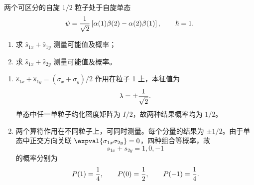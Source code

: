 \begin{question}
两个可区分的自旋 $1/2$ 粒子处于自旋单态
\[
  \psi={1\over\sqrt2}\left[\alpha(1)\beta(2)-\alpha(2)\beta(1)\right],
  \qquad \hbar=1.
\]
\begin{enumerate}
  \item 求 $\hat s_{1x}+\hat s_{1y}$ 测量可能值及概率；
  \item 求 $\hat s_{1x}+\hat s_{2y}$ 测量可能值及概率。
\end{enumerate}
\begin{solution}
\begin{enumerate}
  \item $\hat s_{1x}+\hat s_{1y}=(\sigma_x+\sigma_y)/2$ 作用在粒子 1 上，本征值为
  \[
    \lambda=\pm {1\over\sqrt2}.
  \]
  单态中任一单粒子约化密度矩阵为 $I/2$，故两种结果概率均为 $1/2$。
  \item 两个算符作用在不同粒子上，可同时测量。每个分量的结果为 $\pm1/2$。由于单态中正交方向关联 $\expval{\sigma_{1x}\sigma_{2y}}=0$，四种组合等概率，故
  \[
    s_{1x}+s_{2y}=1,0,-1
  \]
  的概率分别为
  \[
    P(1)={1\over4},
    \qquad P(0)={1\over2},
    \qquad P(-1)={1\over4}.
  \]
\end{enumerate}
\end{solution}
\end{question}

